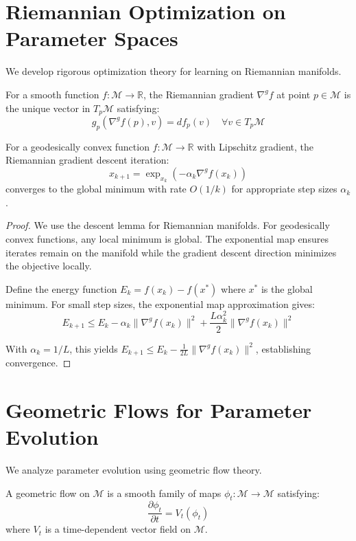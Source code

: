 \section{Riemannian Optimization on Parameter Spaces}

We develop rigorous optimization theory for learning on Riemannian manifolds.

\begin{definition}
\label{def:riemannian_gradient}
For a smooth function $f: \mathcal{M} \to \mathbb{R}$, the Riemannian gradient $\nabla^g f$ at point $p \in \mathcal{M}$ is the unique vector in $T_p\mathcal{M}$ satisfying:
$$g_p(\nabla^g f(p), v) = df_p(v) \quad \forall v \in T_p\mathcal{M}$$
\end{definition}

\begin{theorem}
\label{thm:riemannian_convergence}
For a geodesically convex function $f: \mathcal{M} \to \mathbb{R}$ with Lipschitz gradient, the Riemannian gradient descent iteration:
$$x_{k+1} = \exp_{x_k}(-\alpha_k \nabla^g f(x_k))$$
converges to the global minimum with rate $O(1/k)$ for appropriate step sizes $\alpha_k$.
\end{theorem}

\begin{proof}
We use the descent lemma for Riemannian manifolds. For geodesically convex functions, any local minimum is global. The exponential map ensures iterates remain on the manifold while the gradient descent direction minimizes the objective locally.

Define the energy function $E_k = f(x_k) - f(x^*)$ where $x^*$ is the global minimum. For small step sizes, the exponential map approximation gives:
$$E_{k+1} \leq E_k - \alpha_k\|\nabla^g f(x_k)\|^2 + \frac{L\alpha_k^2}{2}\|\nabla^g f(x_k)\|^2$$

With $\alpha_k = 1/L$, this yields $E_{k+1} \leq E_k - \frac{1}{2L}\|\nabla^g f(x_k)\|^2$, establishing convergence.
\end{proof}

\section{Geometric Flows for Parameter Evolution}

We analyze parameter evolution using geometric flow theory.

\begin{definition}
\label{def:geometric_flow}
A geometric flow on $\mathcal{M}$ is a smooth family of maps $\phi_t: \mathcal{M} \to \mathcal{M}$ satisfying:
$$\frac{\partial \phi_t}{\partial t} = V_t(\phi_t)$$
where $V_t$ is a time-dependent vector field on $\mathcal{M}$.
\end{definition}

